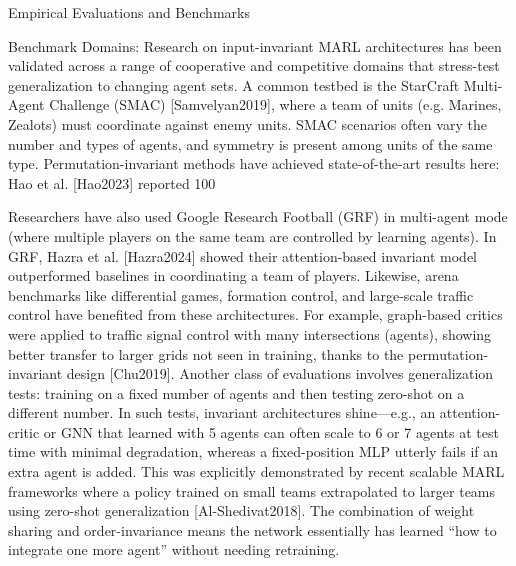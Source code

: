\documentclass{article}
\begin{document}
Empirical Evaluations and Benchmarks

Benchmark Domains: Research on input-invariant MARL architectures has been validated across a range of cooperative and competitive domains that stress-test generalization to changing agent sets. A common testbed is the StarCraft Multi-Agent Challenge (SMAC) [Samvelyan2019], where a team of units (e.g. Marines, Zealots) must coordinate against enemy units. SMAC scenarios often vary the number and types of agents, and symmetry is present among units of the same type. Permutation-invariant methods have achieved state-of-the-art results here: Hao et al. [Hao2023] reported 100%

Researchers have also used Google Research Football (GRF) in multi-agent mode (where multiple players on the same team are controlled by learning agents). In GRF, Hazra et al. [Hazra2024] showed their attention-based invariant model outperformed baselines in coordinating a team of players. Likewise, arena benchmarks like differential games, formation control, and large-scale traffic control have benefited from these architectures. For example, graph-based critics were applied to traffic signal control with many intersections (agents), showing better transfer to larger grids not seen in training, thanks to the permutation-invariant design [Chu2019]. Another class of evaluations involves generalization tests: training on a fixed number of agents and then testing zero-shot on a different number. In such tests, invariant architectures shine—e.g., an attention-critic or GNN that learned with 5 agents can often scale to 6 or 7 agents at test time with minimal degradation, whereas a fixed-position MLP utterly fails if an extra agent is added. This was explicitly demonstrated by recent scalable MARL frameworks where a policy trained on small teams extrapolated to larger teams using zero-shot generalization [Al-Shedivat2018]. The combination of weight sharing and order-invariance means the network essentially has learned “how to integrate one more agent” without needing retraining.
\end{document}
